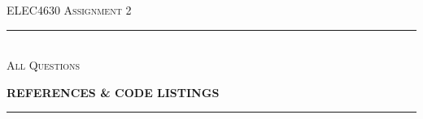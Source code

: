 \begin{titlepage}
  \centering

  \textsc{ELEC4630 Assignment 2}\\
  \vspace{9cm}

  \rule{\linewidth}{0.5pt}\\

  \vspace{1em}
  \LARGE\textsc{All Questions}\\
  \vspace{1em}

  \LARGE\uppercase{\textbf{{References \& Code Listings}}}\\

  \rule{\linewidth}{2pt}\\

  \vfill

\end{titlepage}

\printbibliography


% 

% 

% 

% 

% 